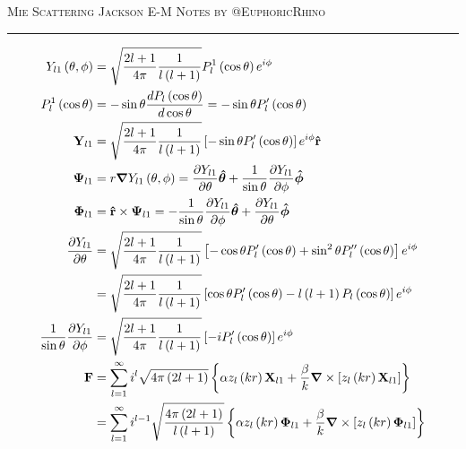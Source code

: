 \documentclass[a4paper, 10pt] {article}
\begin{document}
\noindent\textsc{Mie Scattering}\hfill
\textsc{Jackson E-M Notes by @EuphoricRhino}

\noindent\rule{\textwidth}{1pt}
\begin{align}
  Y_{l1}\left( \theta,\phi \right)&=\sqrt{\frac{2l+1}{4\pi}\frac{1}{l\left( l+1 \right)}}P_{l}^{1}\left( \cos\theta \right)e^{i\phi}\\
  P_{l}^{1}\left( \cos\theta \right)&=-\sin\theta \frac{d P_{l}\left( \cos\theta \right)}{d \cos\theta}=-\sin\theta P_{l}'\left( \cos\theta \right)\\
  \mathbf{Y}_{l1}&=\sqrt{\frac{2l+1}{4\pi}\frac{1}{l\left( l+1 \right)}}\left[ -\sin\theta P_{l}'\left( \cos\theta \right) \right]e^{i\phi}\vu{\mathbf{r}}\\
  \boldsymbol{\Psi}_{l1}&=r\boldsymbol{\nabla}Y_{l1}\left( \theta,\phi \right)=\frac{\partial Y_{l1}}{\partial \theta}\vu{\boldsymbol{\theta}}+\frac{1}{\sin\theta}\frac{\partial Y_{l1}}{\partial \phi}\vu{\boldsymbol{\phi}}\\
  \boldsymbol{\Phi}_{l1}&=\vu{\boldsymbol{r}}\times\boldsymbol{\Psi}_{l1}=-\frac{1}{\sin\theta}\frac{\partial Y_{l1}}{\partial \phi}\vu{\boldsymbol{\theta}}+\frac{\partial Y_{l1}}{\partial \theta}\vu{\boldsymbol{\phi}}\\
  \frac{\partial Y_{l1}}{\partial \theta}&=\sqrt{\frac{2l+1}{4\pi}\frac{1}{l\left( l+1 \right)}}\left[ -\cos\theta P_{l}'\left( \cos\theta \right)+\sin^{2}\theta P_{l}''\left( \cos\theta \right) \right]e^{i\phi}\nonumber\\
                                         &=\sqrt{\frac{2l+1}{4\pi}\frac{1}{l\left( l+1 \right)}}\left[ \cos\theta P_{l}'\left( \cos\theta \right)-l\left( l+1 \right)P_{l}\left( \cos\theta \right) \right]e^{i\phi}\\
  \frac{1}{\sin\theta}\frac{\partial Y_{l1}}{\partial \phi}&=\sqrt{\frac{2l+1}{4\pi}\frac{1}{l\left( l+1 \right)}}\left[-iP_{l}'\left( \cos\theta \right) \right]e^{i\phi}\\
  \mathbf{F}&=\sum_{l=1}^{\infty}i^{l}\sqrt{4\pi\left( 2l+1 \right)}\left\{\alpha z_{l}\left( kr \right)\mathbf{X}_{l1}+\frac{\beta}{k} \boldsymbol{\nabla}\times{\left[ z_{l}\left( kr \right)\mathbf{X}_{l1} \right]}  \right\}\nonumber\\
            &=\sum_{l=1}^{\infty}i^{l-1}\sqrt{\frac{4\pi\left( 2l+1 \right)}{l\left( l+1 \right)}}\left\{ \alpha z_{l}\left( kr \right)\boldsymbol{\Phi}_{l1}+\frac{\beta}{k} \boldsymbol{\nabla}\times\left[ z_{l}\left( kr \right)\boldsymbol{\Phi}_{l1} \right] \right\}\nonumber\\

\end{align}
\end{document}
